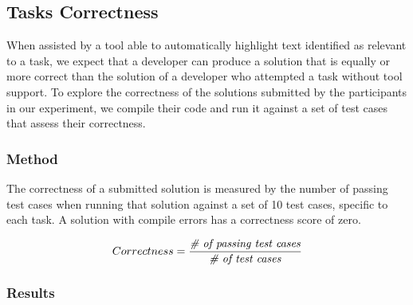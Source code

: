 
\subsection{Tasks Correctness}
\label{cp6:correctness}



When assisted by a tool able to automatically highlight text identified as relevant to a task, we expect that a developer can produce a solution 
that is equally or more correct than the solution of a developer who attempted a task without tool support. 
To explore the correctness of the solutions submitted by the participants in our experiment, we compile their code and run it against a set of test cases 
that assess their correctness.


\subsubsection{Method}


The correctness of a submitted solution is measured by the number of passing test cases
when running that solution against a set of 10 test cases, specific to each task. 
A solution with compile errors has a correctness score of zero.


\smallskip
\begin{small}


\begin{equation}
    Correctness = \frac{ \text{\textit{\# of passing test cases}}}{\text{\textit{\#  of test cases}}}
\end{equation}
\end{small}

\subsubsection{Results}
 